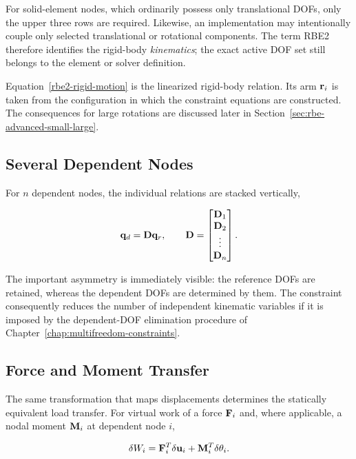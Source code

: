 For solid-element nodes, which ordinarily possess only translational DOFs, only
the upper three rows are required. Likewise, an implementation may intentionally
couple only selected translational or rotational components. The term RBE2
therefore identifies the rigid-body \textit{kinematics}; the exact active DOF set
still belongs to the element or solver definition.

Equation~\eqref{rbe2-rigid-motion} is the linearized rigid-body relation. Its arm
$\mathbf{r}_i$ is taken from the configuration in which the constraint equations are
constructed. The consequences for large rotations are discussed later in
Section~\ref{sec:rbe-advanced-small-large}.

\subsection{Several Dependent Nodes}

For $n$ dependent nodes, the individual relations are stacked vertically,

\begin{equation}\label{rbe2-stacked-transformation}
    \mathbf{q}_d = \mathbf{D}\mathbf{q}_r,
    \qquad
    \mathbf{D}=
    \begin{bmatrix}
        \mathbf{D}_1\\
        \mathbf{D}_2\\
        \vdots\\
        \mathbf{D}_n
    \end{bmatrix}.
\end{equation}

The important asymmetry is immediately visible: the reference DOFs are retained,
whereas the dependent DOFs are determined by them. The constraint consequently
reduces the number of independent kinematic variables if it is imposed by the
dependent-DOF elimination procedure of
Chapter~\ref{chap:multifreedom-constraints}.

\subsection{Force and Moment Transfer}

The same transformation that maps displacements determines the statically
equivalent load transfer. For virtual work of a force $\mathbf{F}_i$ and, where
applicable, a nodal moment $\mathbf{M}_i$ at dependent node $i$,

\begin{equation}
    \delta W_i
    = \mathbf{F}_i^T\delta\mathbf{u}_i
      +\mathbf{M}_i^T\delta\mathbf{\theta}_i.
\end{equation}

